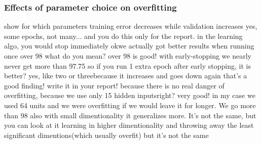 \subsubsection{Effects of parameter choice on overfitting}
show for which parameters training error decreases while validation increases
yes, some epochs, not many... and you do this only for the report. in the learning algo, you would stop immediately
okwe actually got better results when running once over 98%
what do you mean?
over 98 is good!
with early-stopping we nearly never get more than 97.75%
so if you run 1 extra epoch after early stopping, it is better?
yes, like two or threebecause it increases and goes down again
that's a good finding!
write it in your report!
because there is no real danger of overfitting, because we use only 15 hidden inputsright?
very good!
in my case we used 64 units and we were overfitting if we would leave it for longer. We go more than 98 also
with small dimentionality it generalizes more. It's not the same, but you can look at it learning in higher dimentionality and throwing away the least significant dimentions(which usually overfit)
but it's not the same

